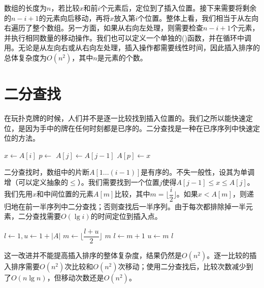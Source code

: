 \documentclass[b5paper]{ctexart}
\begin{document}
数组的长度为$n$，若比较$x$和前$i$个元素后，定位到了插入位置。接下来需要将剩余的$n - i + 1$的元素向后移动，再将$x$放入第$i$个位置。整体上看，我们相当于从左向右遍历了整个数组。另一方面，如果从右向左处理，则需要检查$n - i + 1$个元素，并执行相同数量的移动操作。我们也可以定义一个单独的()函数，并在循环中调用。无论是从左向右或从右向左处理，插入操作都需要线性时间，因此插入排序的总体复杂度为$O(n^2)$，其中$n$是元素的个数。

\begin{Exercise}
\end{Exercise}

\section{二分查找}

在玩扑克牌的时候，人们并不是逐一比较找到插入位置的。我们之所以能快速定位，是因为手中的牌在任何时刻都是已序的。二分查找是一种在已序序列中快速定位的方法。

\begin{algorithmic}[1]
    \State $x \gets A[i]$
    \State $p \gets $ 
      \State $A[j] \gets A[j-1]$
    \EndFor
    \State $A[p] \gets x$
  \EndFor
\EndFunction
\end{algorithmic}

二分查找时，数组中的片断$A[1...(i-1)]$是有序的。不失一般性，设其为单调增（可以定义抽象的$\leq$）。我们需要找到一个位置$j$使得$A[j-1] \leq x \leq A[j]$。我们先用$x$和中间位置的元素$A[m]$比较，其中$m = \lfloor \dfrac{i}{2} \rfloor$。如果$x < A[m]$，则递归地在前一半序列中二分查找；否则查找后一半序列。由于每次都排除掉一半元素，二分查找需要$O(\lg i)$的时间定位到插入点。

\begin{algorithmic}[1]
  \State $l \gets 1, u \gets 1+|A|$
    \State $m \gets \lfloor \dfrac{l+u}{2} \rfloor$
      \State \Return $m$ 
      \State $l \gets m+1$
    \Else
      \State $u \gets m$
    \EndIf
  \EndWhile
  \State \Return $l$
\EndFunction
\end{algorithmic}

这一改进并不能提高插入排序的整体复杂度，结果仍然是$O(n^2)$。逐一比较的插入排序需要$O(n^2)$次比较和$O(n^2)$次移动；使用二分查找后，比较次数减少到了$O(n \lg n)$，但移动次数还是$O(n^2)$。
\end{document}
